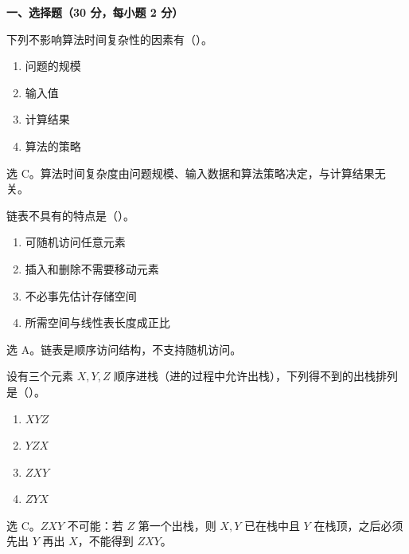 
\textbf{一、选择题（30 分，每小题 2 分）}

\begin{question}
下列不影响算法时间复杂性的因素有（\quad）。
\begin{enumerate}
  \item 问题的规模
  \item 输入值
  \item 计算结果
  \item 算法的策略
\end{enumerate}
\begin{solution}
选 C。算法时间复杂度由问题规模、输入数据和算法策略决定，与计算结果无关。
\end{solution}
\end{question}

\begin{question}
链表不具有的特点是（\quad）。
\begin{enumerate}
  \item 可随机访问任意元素
  \item 插入和删除不需要移动元素
  \item 不必事先估计存储空间
  \item 所需空间与线性表长度成正比
\end{enumerate}
\begin{solution}
选 A。链表是顺序访问结构，不支持随机访问。
\end{solution}
\end{question}

\begin{question}
设有三个元素 $X,Y,Z$ 顺序进栈（进的过程中允许出栈），下列得不到的出栈排列是（\quad）。
\begin{enumerate}
  \item $XYZ$
  \item $YZX$
  \item $ZXY$
  \item $ZYX$
\end{enumerate}
\begin{solution}
选 C。$ZXY$ 不可能：若 $Z$ 第一个出栈，则 $X,Y$ 已在栈中且 $Y$ 在栈顶，之后必须先出 $Y$ 再出 $X$，不能得到 $ZXY$。
\end{solution}
\end{question}

